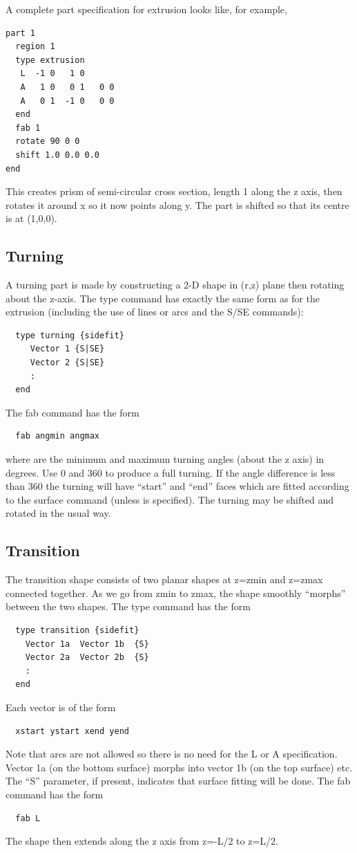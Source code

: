 \documentclass[a4paper,twoside,11pt]{book}
\begin{document}
A complete part specification for extrusion looks like, for example,
\begin{verbatim}
part 1
  region 1
  type extrusion
   L  -1 0   1 0
   A   1 0   0 1   0 0
   A   0 1  -1 0   0 0
  end  
  fab 1
  rotate 90 0 0
  shift 1.0 0.0 0.0
end
\end{verbatim}
This creates prism of semi-circular cross section, length 1 along the
z axis, then rotates it around x so it now points along y. The part is
shifted so that its centre is at (1,0,0).

\subsection{Turning}
A turning part is made by constructing a 2-D shape in (r,z) plane then
rotating about the z-axis. The type command has exactly the same form
as for the extrusion (including the use of lines or arcs and the S/SE
commands):
\begin{verbatim}
  type turning {sidefit}
     Vector 1 {S|SE}
     Vector 2 {S|SE}
     :
  end
\end{verbatim}

The fab command has the form
\begin{verbatim}
  fab angmin angmax
\end{verbatim}
where  are the minimum and maximum turning angles
(about the z axis) in degrees. Use 0 and 360 to produce a full
turning. If the angle difference is less than 360 the turning will
have ``start'' and ``end'' faces which are fitted according to the surface
command (unless  is specified). The turning may be shifted and
rotated in the usual way.

\subsection{Transition}

The transition shape consists of two planar shapes at z=zmin and
z=zmax connected together. As we go from zmin to zmax, the shape
smoothly ``morphs'' between the two shapes. The type command has the form
\begin{verbatim}
  type transition {sidefit}
    Vector 1a  Vector 1b  {S}
    Vector 2a  Vector 2b  {S}
    :
  end
\end{verbatim}
Each vector is of the form
\begin{verbatim}
  xstart ystart xend yend
\end{verbatim}
Note that arcs are not allowed so there is no need for the L or A
specification. Vector 1a (on the bottom surface) morphs into vector 1b
(on the top surface) etc. The ``S'' parameter, if present, indicates
that surface fitting will be done. The fab command has the form
\begin{verbatim}
  fab L
\end{verbatim}
The shape then extends along the z axis from z=-L/2 to z=L/2.
\end{document}
